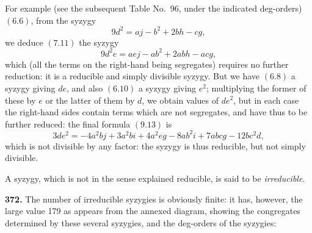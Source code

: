 \documentclass[12pt,a4paper]{article}
\begin{document}
For example (see the subsequent Table No.~96, under the indicated deg-orders) $(6.6)$, from the syzygy
\[
9d^2 = aj - b^2 + 2bh - cg,
\]
we deduce $(7.11)$ the syzygy
\[
9d^2 e = ae j - ab^2 + 2abh - acg,
\]
which (all the terms on the right-hand being segregates) requires no further reduction: it is a reducible and simply divisible syzygy. But we have $(6.8)$ a syzygy giving $de$, and also $(6.10)$ a syzygy giving $e^2$; multiplying the former of these by $e$ or the latter of them by $d$, we obtain values of $de^2$, but in each case the right-hand sides contain terms which are not segregates, and have thus to be further reduced: the final formula $(9.13)$ is
\[
3de^2 = -4a^2 bj + 3a^2 bi + 4a^2 eg - 8ab^2 i + 7abcg - 12bc^2 d,
\]
which is not divisible by any factor: the syzygy is thus reducible, but not simply divisible.

A syzygy, which is not in the sense explained reducible, is said to be \textit{irreducible}.

\medskip

\noindent\textbf{372.} The number of irreducible syzygies is obviously finite: it has, however, the large value 179 as appears from the annexed diagram, showing the congregates determined by these several syzygies, and the deg-orders of the syzygies:

\clearpage
\end{document}
